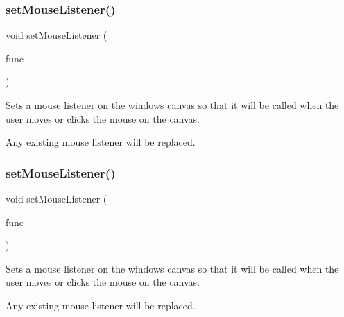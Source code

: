 \subsubsection{\texorpdfstring{set\+Mouse\+Listener()}{setMouseListener()}\hspace{0.1cm}{\footnotesize\ttfamily [1/2]}}
{\footnotesize\ttfamily void set\+Mouse\+Listener (\begin{DoxyParamCaption}\item[{\mbox{\hyperlink{namespacesgl_ae9f3e9eab70035da1a2b114e21357b25}{G\+Event\+Listener}}}]{func }\end{DoxyParamCaption})\hspace{0.3cm}{\ttfamily [virtual]}}



Sets a mouse listener on the window\textquotesingle{}s canvas so that it will be called when the user moves or clicks the mouse on the canvas. 

Any existing mouse listener will be replaced. \mbox{\label{classsgl_1_1GWindow_aea7f647ea62d59f71b5fad6aa65eeaf9}} 
\subsubsection{\texorpdfstring{set\+Mouse\+Listener()}{setMouseListener()}\hspace{0.1cm}{\footnotesize\ttfamily [2/2]}}
{\footnotesize\ttfamily void set\+Mouse\+Listener (\begin{DoxyParamCaption}\item[{\mbox{\hyperlink{namespacesgl_a54427ce97bb1c2804e4fe2b0a62e8b17}{G\+Event\+Listener\+Void}}}]{func }\end{DoxyParamCaption})\hspace{0.3cm}{\ttfamily [virtual]}}



Sets a mouse listener on the window\textquotesingle{}s canvas so that it will be called when the user moves or clicks the mouse on the canvas. 

Any existing mouse listener will be replaced. \mbox{\label{classsgl_1_1GDrawingSurface_a09f9640e4ff7388dcfc391efd88d2415}} 
